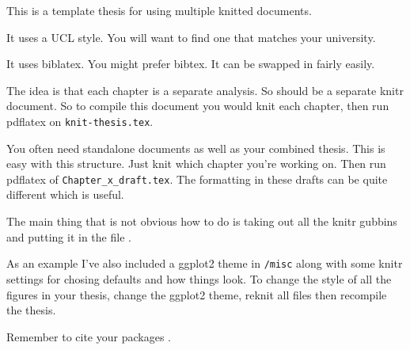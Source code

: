 

This is a template thesis for using multiple knitted documents.

It uses a UCL style.
You will want to find one that matches your university.

It uses biblatex. 
You might prefer bibtex. 
It can be swapped in fairly easily.

The idea is that each chapter is a separate analysis.
So should be a separate knitr document.
So to compile this document you would knit each chapter, then run pdflatex on \texttt{knit-thesis.tex}.

You often need standalone documents as well as your combined thesis.
This is easy with this structure.
Just knit which chapter you're working on.
Then run pdflatex of \texttt{Chapter_x_draft.tex}.
The formatting in these drafts can be quite different which is useful.

The main thing that is not obvious how to do is taking out all the knitr gubbins and putting it in the file .

As an example I've also included a ggplot2 theme in \texttt{/misc} along with some knitr settings for chosing defaults and how things look.
To change the style of all the figures in your thesis, change the ggplot2 theme, reknit all files then recompile the thesis.


Remember to cite your packages \cite{xie2013dynamic, R}.


